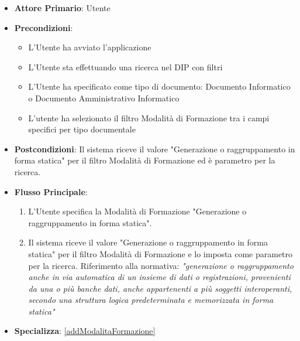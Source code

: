 \begin{itemize}
      \item \textbf{Attore Primario}: Utente
      \item \textbf{Precondizioni}: 
      \begin{itemize}
            \item L'Utente ha avviato l'applicazione
            \item L'Utente sta effettuando una ricerca nel DIP con filtri
            \item L'Utente ha specificato come tipo di documento: Documento Informatico o Documento Amministrativo Informatico
            \item L'utente ha selezionato il filtro Modalità di Formazione tra i campi specifici per tipo documentale
      \end{itemize}
      \item \textbf{Postcondizioni}: Il sistema riceve il valore "Generazione o raggruppamento in forma statica" per il filtro Modalità di Formazione ed è parametro per la ricerca.
      \item \textbf{Flusso Principale}:
      \begin{enumerate}
            \item L'Utente specifica la Modalità di Formazione "Generazione o raggruppamento in forma statica".
            \item Il sistema riceve il valore "Generazione o raggruppamento in forma statica" per il filtro Modalità di Formazione e lo imposta come parametro per la ricerca. Riferimento alla normativa: \textit{"generazione o raggruppamento anche in via automatica di un insieme di dati o registrazioni, provenienti da una o più banche dati, anche appartenenti a più soggetti interoperanti, secondo una struttura logica predeterminata e memorizzata in forma statica"}
      \end{enumerate}
      \item \textbf{Specializza}: \ref{addModalitaFormazione}
\end{itemize}

